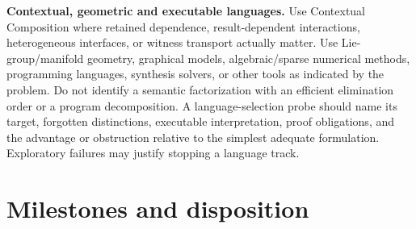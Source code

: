 \documentclass[11pt,letterpaper]{article}
\begin{document}
\textbf{Contextual, geometric and executable languages.} Use Contextual Composition where retained dependence, result-dependent interactions, heterogeneous interfaces, or witness transport actually matter. Use Lie-group/manifold geometry, graphical models, algebraic/sparse numerical methods, programming languages, synthesis solvers, or other tools as indicated by the problem. Do not identify a semantic factorization with an efficient elimination order or a program decomposition. A language-selection probe should name its target, forgotten distinctions, executable interpretation, proof obligations, and the advantage or obstruction relative to the simplest adequate formulation. Exploratory failures may justify stopping a language track.

\section{Milestones and disposition}\label{sec:accept}
\end{document}
